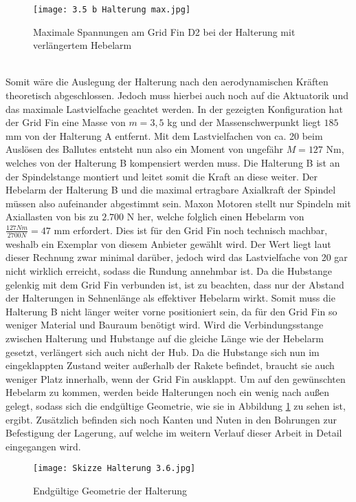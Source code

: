 \begin{figure}[h] 
	\centering
	\texttt{[image: 3.5 b Halterung max.jpg]}
	\caption{Maximale Spannungen am Grid Fin D2 bei der Halterung mit verlängertem Hebelarm}
\end{figure}\\
Somit wäre die Auslegung der Halterung nach den aerodynamischen Kräften theoretisch abgeschlossen. Jedoch muss hierbei auch noch auf die Aktuatorik und das maximale Lastvielfache geachtet werden. In der gezeigten Konfiguration hat der Grid Fin eine Masse von $m = 3,5$ kg und der Massenschwerpunkt liegt $185$ mm von der Halterung A entfernt. Mit dem Lastvielfachen von ca. 20 beim Auslösen des Ballutes entsteht nun also ein Moment von ungefähr $M=127$ Nm, welches von der Halterung B kompensiert werden muss. Die Halterung B ist an der Spindelstange montiert und leitet somit die Kraft an diese weiter. Der Hebelarm der Halterung B und die maximal ertragbare Axialkraft der Spindel müssen also aufeinander abgestimmt sein. Maxon Motoren stellt nur Spindeln mit Axiallasten von bis zu $2.700$ N her, welche folglich einen Hebelarm von $\frac{127Nm}{2700N}=47$ mm erfordert. Dies ist für den Grid Fin noch technisch machbar, weshalb ein Exemplar von diesem Anbieter gewählt wird. Der Wert liegt laut dieser Rechnung zwar minimal darüber, jedoch wird das Lastvielfache von 20 gar nicht wirklich erreicht, sodass die Rundung annehmbar ist. Da die Hubstange gelenkig mit dem Grid Fin verbunden ist, ist zu beachten, dass nur der Abstand der Halterungen in Sehnenlänge als effektiver Hebelarm wirkt. Somit muss die Halterung B nicht länger weiter vorne positioniert sein, da für den Grid Fin so weniger Material und Bauraum benötigt wird. Wird die Verbindungsstange zwischen Halterung und Hubstange auf die gleiche Länge wie der Hebelarm gesetzt, verlängert sich auch nicht der Hub. Da die Hubstange sich nun im eingeklappten Zustand weiter außerhalb der Rakete befindet, braucht sie auch weniger Platz innerhalb, wenn der Grid Fin ausklappt. Um auf den gewünschten Hebelarm zu kommen, werden beide Halterungen noch ein wenig nach außen gelegt, sodass sich die endgültige Geometrie, wie sie in Abbildung \ref{abb_Halterung-fertig} zu sehen ist, ergibt. Zusätzlich befinden sich noch Kanten und Nuten in den Bohrungen zur Befestigung der Lagerung, auf welche im weitern Verlauf dieser Arbeit in Detail eingegangen wird.
\begin{figure}[h] 
	\centering
	\texttt{[image: Skizze Halterung 3.6.jpg]}
	\caption{Endgültige Geometrie der Halterung}
	\label{abb_Halterung-fertig}
\end{figure}\\

